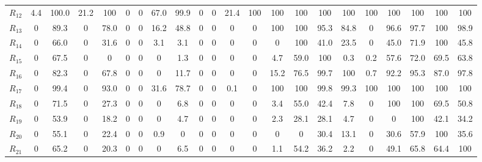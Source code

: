 \begin{table}[h!]
\begin{tabularx}{\textwidth}{X|CCCCCCCCCCCCCCCCCCCCC}
$R_{12}$ & 4.4 & 100.0 & 21.2 & 100 & 0 & 0 & 67.0 & 99.9 & 0 & 0 & 21.4 & 100 & 100 & 100 & 100 & 100 & 100 & 100 & 100 & 100 & 100 \\
$R_{13}$ & 0 & 89.3 & 0 & 78.0 & 0 & 0 & 16.2 & 48.8 & 0 & 0 & 0 & 0 & 100 & 100 & 95.3 & 84.8 & 0 & 96.6 & 97.7 & 100 & 98.9 \\
$R_{14}$ & 0 & 66.0 & 0 & 31.6 & 0 & 0 & 3.1 & 3.1 & 0 & 0 & 0 & 0 & 0 & 100 & 41.0 & 23.5 & 0 & 45.0 & 71.9 & 100 & 45.8 \\
$R_{15}$ & 0 & 67.5 & 0 & 0 & 0 & 0 & 0 & 1.3 & 0 & 0 & 0 & 0 & 4.7 & 59.0 & 100 & 0.3 & 0.2 & 57.6 & 72.0 & 69.5 & 63.8 \\
$R_{16}$ & 0 & 82.3 & 0 & 67.8 & 0 & 0 & 0 & 11.7 & 0 & 0 & 0 & 0 & 15.2 & 76.5 & 99.7 & 100 & 0.7 & 92.2 & 95.3 & 87.0 & 97.8 \\
$R_{17}$ & 0 & 99.4 & 0 & 93.0 & 0 & 0 & 31.6 & 78.7 & 0 & 0 & 0.1 & 0 & 100 & 100 & 99.8 & 99.3 & 100 & 100 & 100 & 100 & 100 \\
$R_{18}$ & 0 & 71.5 & 0 & 27.3 & 0 & 0 & 0 & 6.8 & 0 & 0 & 0 & 0 & 3.4 & 55.0 & 42.4 & 7.8 & 0 & 100 & 100 & 69.5 & 50.8 \\
$R_{19}$ & 0 & 53.9 & 0 & 18.2 & 0 & 0 & 0 & 4.7 & 0 & 0 & 0 & 0 & 2.3 & 28.1 & 28.1 & 4.7 & 0 & 0 & 100 & 42.1 & 34.2 \\
$R_{20}$ & 0 & 55.1 & 0 & 22.4 & 0 & 0 & 0.9 & 0 & 0 & 0 & 0 & 0 & 0 & 0 & 30.4 & 13.1 & 0 & 30.6 & 57.9 & 100 & 35.6 \\
$R_{21}$ & 0 & 65.2 & 0 & 20.3 & 0 & 0 & 0 & 6.5 & 0 & 0 & 0 & 0 & 1.1 & 54.2 & 36.2 & 2.2 & 0 & 49.1 & 65.8 & 64.4 & 100 \\
\bottomrule
\end{tabularx}
\end{table}
